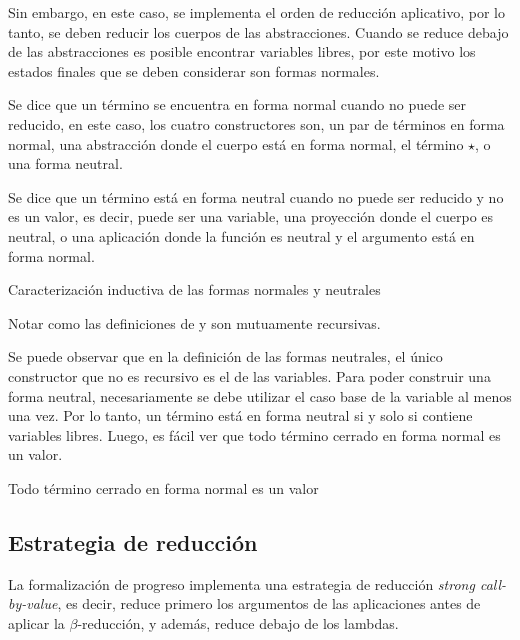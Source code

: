 \documentclass[]{report}
\begin{document}
	Sin embargo, en este caso, se implementa el orden de reducción aplicativo, por lo tanto, se deben reducir los cuerpos de las abstracciones.
	Cuando se reduce debajo de las abstracciones es posible encontrar variables libres, por este motivo los estados finales que se deben considerar son formas normales.
	
	Se dice que un término se encuentra en forma normal cuando no puede ser reducido, en este caso, los cuatro constructores son, un par de términos en forma normal, una abstracción donde el cuerpo está en forma normal, el término $\star$, o una forma neutral.
	
	Se dice que un término está en forma neutral cuando no puede ser reducido y no es un valor, es decir, puede ser una variable, una proyección donde el cuerpo es neutral, o una aplicación donde la función es neutral y el argumento está en forma normal.
	
	\begin{codigo}
		Caracterización inductiva de las formas normales y neutrales
	\end{codigo}
	
	Notar como las definiciones de \AgdaInductiveConstructor{$\Uparrow$} y \AgdaInductiveConstructor{$\Downarrow$} son mutuamente recursivas.
	
	Se puede observar que en la definición de las formas neutrales, el único constructor que no es recursivo es el de las variables.
	Para poder construir una forma neutral, necesariamente se debe utilizar el caso base de la variable al menos una vez.
	Por lo tanto, un término está en forma neutral si y solo si contiene variables libres.
	Luego, es fácil ver que todo término cerrado en forma normal es un valor.
	
	\begin{codigo}
		Todo término cerrado en forma normal es un valor
		\ExecuteMetaData[code/progress.tex]{proof}
	\end{codigo}
	
	\subsection{Estrategia de reducción}
	
	La formalización de progreso implementa una estrategia de reducción \textit{strong call-by-value}, es decir, reduce primero los argumentos de las aplicaciones antes de aplicar la $\beta$-reducción, y además, reduce debajo de los lambdas.
	
\end{document}
